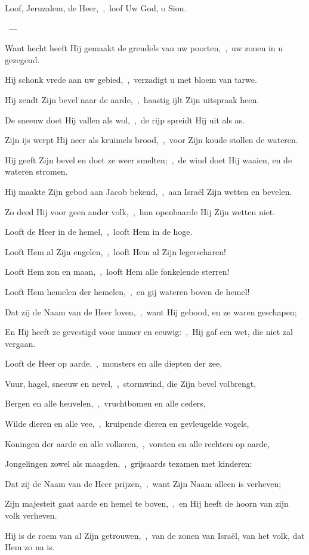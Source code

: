 \documentclass[12pt,twoside,a5paper]{article}
\begin{document}

\begin{halfparskip}
   Loof, Jeruzalem, de Heer,~\sep\ loof Uw God, o Sion.

  ~--- 

  Want hecht heeft Hij gemaakt de grendels van uw poorten,~\sep\ uw zonen in u gezegend.

  Hij schonk vrede aan uw gebied,~\sep\ verzadigt u met bloem van tarwe.

  Hij zendt Zijn bevel naar de aarde,~\sep\ haastig ijlt Zijn uitspraak heen.

  De sneeuw doet Hij vallen als wol,~\sep\ de rijp spreidt Hij uit als as.

  Zijn ijs werpt Hij neer als kruimels brood,~\sep\ voor Zijn koude stollen de wateren.

  Hij geeft Zijn bevel en doet ze weer smelten;~\sep\ de wind doet Hij waaien, en de wateren stromen.

  Hij maakte Zijn gebod aan Jacob bekend,~\sep\ aan Israël Zijn wetten en bevelen.

  Zo deed Hij voor geen ander volk,~\sep\ hun openbaarde Hij Zijn wetten niet.
\end{halfparskip}

\begin{halfparskip}
   Looft de Heer in de hemel,~\sep\ looft Hem in de hoge.

  Looft Hem al Zijn engelen,~\sep\ looft Hem al Zijn legerscharen!

  Looft Hem zon en maan,~\sep\ looft Hem alle fonkelende sterren!

  Looft Hem hemelen der hemelen,~\sep\ en gij wateren boven de hemel!

  Dat zij de Naam van de Heer loven,~\sep\ want Hij gebood, en ze waren geschapen;

  En Hij heeft ze gevestigd voor immer en eeuwig:~\sep\ Hij gaf een wet, die niet zal vergaan.

  Looft de Heer op aarde,~\sep\ monsters en alle diepten der zee,

  Vuur, hagel, sneeuw en nevel,~\sep\ stormwind, die Zijn bevel volbrengt,

  Bergen en alle heuvelen,~\sep\ vruchtbomen en alle ceders,

  Wilde dieren en alle vee,~\sep\ kruipende dieren en gevleugelde vogels,

  Koningen der aarde en alle volkeren,~\sep\ vorsten en alle rechters op aarde,

  Jongelingen zowel als maagden,~\sep\ grijsaards tezamen met kinderen:

  Dat zij de Naam van de Heer prijzen,~\sep\ want Zijn Naam alleen is verheven;

  Zijn majesteit gaat aarde en hemel te boven,~\sep\ en Hij heeft de hoorn van zijn volk verheven.

  Hij is de roem van al Zijn getrouwen,~\sep\ van de zonen van Israël, van het volk, dat Hem zo na is.
\end{halfparskip}
\end{document}
